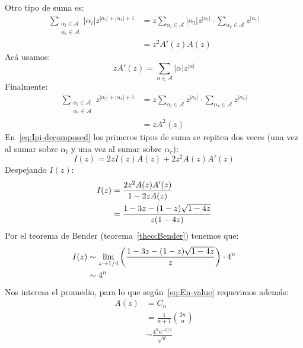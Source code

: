   Otro tipo de suma es:
  \begin{align*}
    \sum_{\substack{\alpha_l \in \mathcal{A} \\
		    \alpha_r \in \mathcal{A}}}
      \lvert \alpha_l \rvert
      z^{\lvert \alpha_l \rvert + \lvert \alpha_r \rvert + 1}
    &= z \sum_{\alpha_l \in \mathcal{A}}
	   \lvert \alpha_l \rvert z^{\lvert \alpha_l \rvert}
	 \cdot \sum_{\alpha_r \in \mathcal{A}} z^{\lvert \alpha_r \rvert} \\
    &= z^2 A'(z) A(z)
  \end{align*}
  Acá usamos:
  \begin{equation*}
    z A'(z)
      = \sum_{\alpha \in \mathcal{A}}
	  \lvert \alpha \rvert z^{\lvert \alpha \rvert}
  \end{equation*}
  Finalmente:
  \begin{align*}
    \sum_{\substack{\alpha_l \in \mathcal{A} \\
		    \alpha_r \in \mathcal{A}}}
      z^{\lvert \alpha_l \rvert + \lvert \alpha_r \rvert + 1}
      &= z \sum_{\alpha_l \in \mathcal{A}} z^{\lvert \alpha_l \rvert}
	    \cdot \sum_{\alpha_r \in \mathcal{A}} z^{\lvert \alpha_r \rvert} \\
      &= z A^2(z)
  \end{align*}
  En~\eqref{eq:Ipi-decomposed}
  los primeros tipos de suma se repiten dos veces
  (una vez al sumar sobre \(\alpha_l\) y una vez al sumar sobre \(\alpha_r\)):
  \begin{equation}
    \label{eq:Ipi-functional}
    I(z)
      = 2 z I(z) A(z) + 2 z^2 A(z) A'(z)
  \end{equation}
  Despejando \(I(z)\):
  \begin{align}
    I(z)
      &= \frac{2 z^2 A(z) A'(z)}{1 - 2 z A(z)} \notag \\
      &= \frac{1 - 3 z - (1 - z) \sqrt{1 - 4 z}}{z (1 - 4 z)}
	    \label{eq:Ipi-explicit}
  \end{align}
  Por el teorema de Bender
  (teorema~\ref{theo:Bender})%
  tenemos que:
  \begin{align}
    [z^n] I(z)
      &\sim \lim_{z \to 1/4}
	      \left(
		\frac{1 - 3 z - (1 - z) \sqrt{1 - 4 z}}{z}
	      \right)
	      \cdot 4^n \notag \\
      &\sim 4^n
	 \label{eq:In-asy}
  \end{align}
  Nos interesa el promedio,%
  para lo que según~\eqref{eq:En-value} requerimos además:
  \begin{align*}
    [z^n] A(z)
      &=    C_n \\
      &=    \frac{1}{n + 1} \binom{2 n}{n} \\
      &\sim \frac{4^n n^{-3/2}}{\sqrt{\pi}}
  \end{align*}
